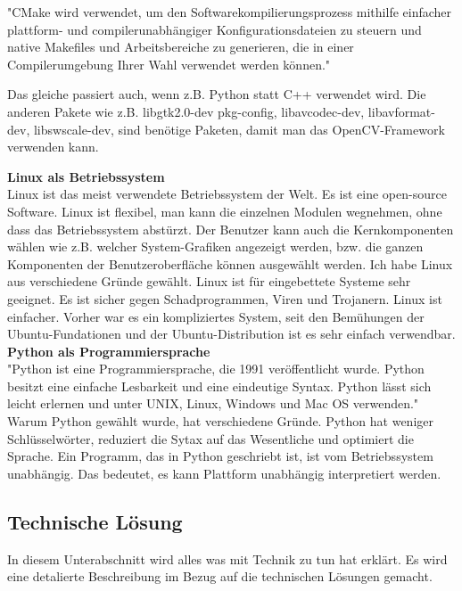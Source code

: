 "CMake wird verwendet, um den Softwarekompilierungsprozess mithilfe einfacher plattform- und compilerunabh\"angiger Konfigurationsdateien zu steuern und native Makefiles und Arbeitsbereiche zu generieren, die in einer Compilerumgebung Ihrer Wahl verwendet werden k\"onnen."\cite{cmake}

Das gleiche passiert auch, wenn z.B. Python statt C++ verwendet wird. Die anderen Pakete wie z.B. libgtk2.0-dev pkg-config, libavcodec-dev, libavformat-dev, libswscale-dev, sind ben\"otige Paketen, damit man das OpenCV-Framework verwenden kann. 
 
\textbf{Linux als Betriebssystem} \cite{Linux_Betriebssystem}  \\
Linux ist das meist verwendete Betriebssystem der Welt. Es ist eine open-source Software. Linux ist flexibel, man kann die einzelnen Modulen wegnehmen, ohne dass das Betriebssystem abst\"urzt. Der Benutzer kann auch die Kernkomponenten w\"ahlen wie z.B. welcher System-Grafiken angezeigt werden, bzw. die ganzen Komponenten der Benutzeroberfl\"ache k\"onnen ausgew\"ahlt werden. Ich habe Linux aus verschiedene Gr\"unde gew\"ahlt. Linux ist f\"ur eingebettete Systeme sehr geeignet. Es ist sicher gegen Schadprogrammen, Viren und Trojanern. Linux ist einfacher. Vorher war es ein kompliziertes System, seit den Bem\"uhungen der Ubuntu-Fundationen und der Ubuntu-Distribution ist es sehr einfach verwendbar.\\
\textbf{Python als Programmiersprache} \\
"Python ist eine Programmiersprache, die 1991 ver\"offentlicht wurde. Python besitzt eine einfache Lesbarkeit und eine eindeutige Syntax. Python l\"asst sich leicht erlernen und unter UNIX, Linux, Windows und Mac OS verwenden." \cite{python} Warum Python gew\"ahlt wurde, hat verschiedene Gr\"unde. Python hat weniger Schl\"usselw\"orter, reduziert die Sytax auf das Wesentliche und optimiert die Sprache. Ein Programm, das in Python geschriebt ist, ist vom Betriebssystem unabh\"angig. Das bedeutet, es kann Plattform unabh\"angig interpretiert werden. \\
	
\subsection{Technische L\"osung}
\label{section:technischelosung}
In diesem Unterabschnitt wird alles was mit Technik zu tun hat erkl\"art. Es wird eine detalierte Beschreibung im Bezug auf die technischen Lösungen gemacht.
\\
\\


